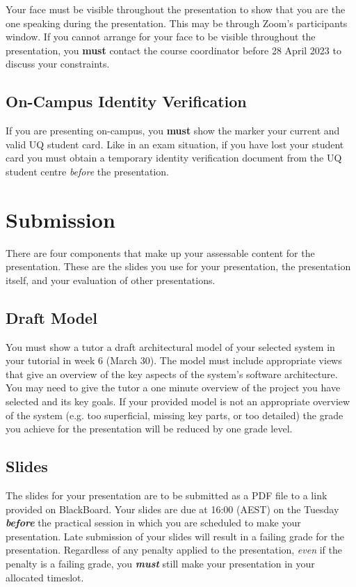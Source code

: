 \documentclass{csse4400}
\begin{document}
Your face must be visible throughout the presentation to show that you are the one speaking during the presentation.
This may be through Zoom's participants window.
If you cannot arrange for your face to be visible throughout the presentation,
you \textbf{must} contact the course coordinator before 28 April 2023 to discuss your constraints.

\subsection{On-Campus Identity Verification}
If you are presenting on-campus, you \textbf{must} show the marker your current and valid UQ student card.
Like in an exam situation, if you have lost your student card
you must obtain a temporary identity verification document from the UQ student centre \emph{before} the presentation.


\section{Submission}
There are four components that make up your assessable content for the presentation.
These are the slides you use for your presentation, the presentation itself, and your evaluation of other presentations.

\subsection{Draft Model}
You must show a tutor a draft architectural model of your selected system in your tutorial in week 6 (March 30).
The model must include appropriate views that give an overview of the key aspects of the system's software architecture.
You may need to give the tutor a one minute overview of the project you have selected and its key goals.
If your provided model is not an appropriate overview of the system
(e.g. too superficial, missing key parts, or too detailed)
the grade you achieve for the presentation will be reduced by one grade level.

\subsection{Slides}
The slides for your presentation are to be submitted as a PDF file to a link provided on BlackBoard.
Your slides are due at 16:00 (AEST) on the Tuesday \textbf{\textit{before}}
the practical session in which you are scheduled to make your presentation.
Late submission of your slides will result in a failing grade for the presentation.
Regardless of any penalty applied to the presentation, \emph{even} if the penalty is a failing grade,
you \textbf{\textit{must}} still make your presentation in your allocated timeslot.
\end{document}
